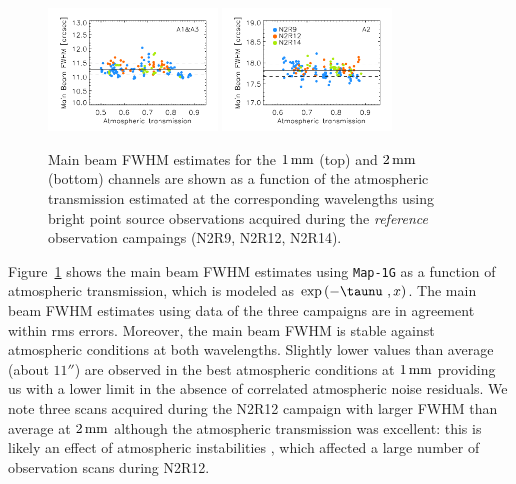 \begin{figure}[!thbp]
\begin{center}
  \includegraphics[clip, width=0.4\textwidth]{Figures/plot_FWHM_vs_atmtrans_mb_radius_binning2_1mm.pdf}
  \includegraphics[clip, width=0.4\textwidth]{Figures/plot_FWHM_vs_atmtrans_mb_radius_binning2_a2.pdf}
  \caption[Main Beam FWHM]{Main beam FWHM estimates for the
    $1\,\rm{mm}$ (top) and $2\,\rm{mm}$ (bottom) channels are shown as
    a function of the atmospheric transmission estimated at the
    corresponding wavelengths using bright point source observations
  acquired during the \emph{reference} observation campaings (N2R9, N2R12, N2R14).}
\label{fig:fwhm_map_atmtrans}
\end{center}
\end{figure}

Figure~\ref{fig:fwhm_map_atmtrans} shows the main beam FWHM estimates
using {\tt Map-1G} as a function of atmospheric transmission,
which is modeled as $\exp{\left(-\taunu \ ,x\right)}$. %
The main beam FWHM estimates using data of the three campaigns are in
agreement within rms errors. Moreover, the main beam FWHM is stable
against atmospheric conditions at both wavelengths. Slightly lower
values than average (about $11''$) are observed in the best
atmospheric conditions at $1\,\rm{mm}$ providing us with a lower limit
in the absence of correlated atmospheric noise residuals. We note
three scans acquired during the N2R12 campaign with larger FWHM than average at
$2\,\rm{mm}$ although the atmospheric transmission was excellent: this
is likely an effect of atmospheric instabilities
, which affected a large number of observation scans during N2R12. 



